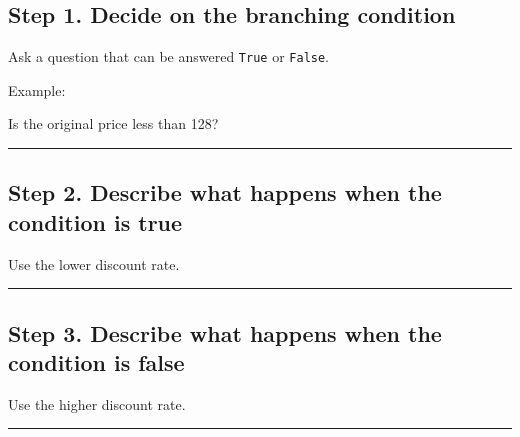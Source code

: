 \documentclass[
  11pt,
  a4paper,
]{article}
\newenvironment{Shaded}{}{}
\newcommand{\NormalTok}[1]{#1}
\begin{document}
\subsection{Step 1. Decide on the branching
condition}\label{step-1.-decide-on-the-branching-condition}

Ask a question that can be answered \texttt{True} or \texttt{False}.

Example:

\begin{Shaded}
\begin{Highlighting}[]
\NormalTok{Is the original price less than 128?}
\end{Highlighting}
\end{Shaded}

\begin{center}\rule{0.5\linewidth}{0.5pt}\end{center}

\subsection{Step 2. Describe what happens when the condition is
true}\label{step-2.-describe-what-happens-when-the-condition-is-true}

\begin{Shaded}
\begin{Highlighting}[]
\NormalTok{Use the lower discount rate.}
\end{Highlighting}
\end{Shaded}

\begin{center}\rule{0.5\linewidth}{0.5pt}\end{center}

\subsection{Step 3. Describe what happens when the condition is
false}\label{step-3.-describe-what-happens-when-the-condition-is-false}

\begin{Shaded}
\begin{Highlighting}[]
\NormalTok{Use the higher discount rate.}
\end{Highlighting}
\end{Shaded}

\begin{center}\rule{0.5\linewidth}{0.5pt}\end{center}
\end{document}
